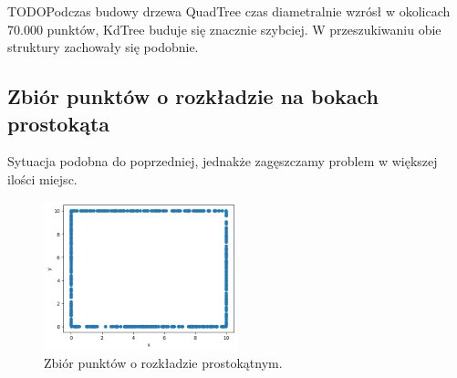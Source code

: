 \documentclass{lab}
\begin{document}
TODOPodczas budowy drzewa QuadTree czas diametralnie wzrósł w okolicach 70.000 punktów, KdTree buduje się znacznie szybciej. W przeszukiwaniu obie struktury zachowały się podobnie.

\newpage
\subsection{Zbiór punktów o rozkładzie na bokach prostokąta}
Sytuacja podobna do poprzedniej, jednakże zagęszczamy problem w większej ilości miejsc.

\begin{figure}[H]
  \centering
  \includegraphics[width=0.5\textwidth]{resources/rectangle.png}
  \caption{Zbiór punktów o rozkładzie prostokątnym.}
  \label{fig:rectangle}
\end{figure}
\end{document}
